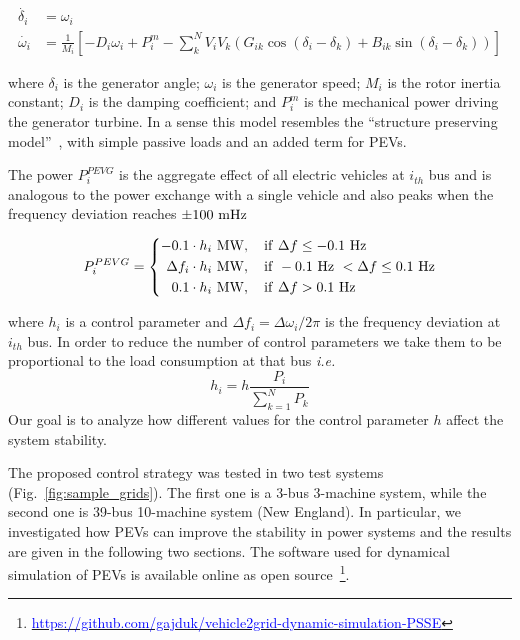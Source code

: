 \documentclass[final,12pt]{elsarticle}
\begin{document}
\begin{align}
\dot{\delta_i} &= \omega_i  \nonumber\\
\dot{\omega_i} &= \frac{1}{M_i} \left[ -D_i \omega_i + P_i^m - \sum_k^N V_i V_k \left( G_{ik}\cos(\delta_i-\delta_k)+B_{ik}\sin(\delta_i-\delta_k) \right)\right] \label{eq:swing}
\end{align}

\noindent where $\delta_i$ is the generator angle; $\omega_i$ is the generator speed; $M_i$ is the rotor inertia constant; $D_i$ is the damping coefficient; and $P_i^m$ is the mechanical power driving the generator turbine. In a sense this model resembles the ``structure preserving model''~\cite{van1985structure}, with simple passive loads and an added term for PEVs.

The power $P^{PEVG}_i$ is the aggregate effect of all electric vehicles at $i_{th}$ bus and is analogous to the power exchange with a single vehicle and also peaks when the frequency deviation reaches $\pm 100~{\rm mHz}$

\begin{equation*}
P_i^{PEVG} = \left\{
\begin{aligned}
-0.1 \cdot h_i~&{\rm MW}, \quad {\rm if~} \Delta f \le -0.1 {\rm ~Hz}\\
\Delta f_i \cdot h_i~&{\rm MW}, \quad {\rm if~} -0.1 {\rm ~Hz~} < \Delta f \le 0.1 {\rm ~Hz}\\
0.1 \cdot h_i~&{\rm MW}, \quad {\rm if~} \Delta f > 0.1 {\rm ~Hz}\\
\end{aligned}
\right.
\end{equation*}

\noindent where $h_i$ is a control parameter and $\Delta f_i = \Delta \omega_i /
2 \pi  $ is the frequency deviation at $i_{th}$ bus. 
In order to reduce the number of control parameters we take them to be
proportional to the load consumption at that bus \textit{i.e.} 
$$
h_i = h \frac{P_i}{\sum_{k=1}^N P_k}
$$
Our goal is to analyze how different values for the control parameter $h$ affect the system stability.















The proposed control strategy was tested in two test systems
(Fig.~\ref{fig:sample_grids}). The first one is a 3-bus 3-machine system, while
the second one is 39-bus 10-machine system (New England). In particular, we
investigated how PEVs can improve the stability in power systems and the results
are given in the following two sections. 
The software used for dynamical simulation of PEVs is available online as open source~\footnote{\href{https://github.com/gajduk/vehicle2grid-dynamic-simulation-PSSE}{\textcolor{blue}{https://github.com/gajduk/vehicle2grid-dynamic-simulation-PSSE}}}.
\end{document}
